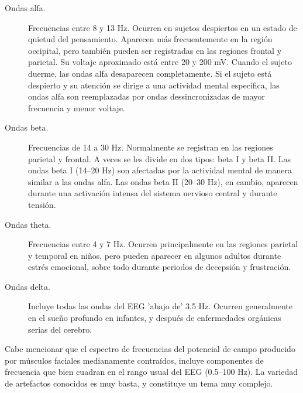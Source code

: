 \documentclass[12pt,a4paper]{mitthesis}
\begin{document}
\begin{description}
\item[Ondas alfa.] Frecuencias entre 8 y 13 Hz. Ocurren en sujetos despiertos en un estado de 
quietud del pensamiento. Aparecen m\'as frecuentemente en la regi\'on occipital, pero tambi\'en 
pueden ser registradas en las regiones frontal y parietal. Su voltaje aproximado est\'a entre 20 y 
200 mV. Cuando el sujeto duerme, las ondas alfa desaparecen completamente. Si el sujeto est\'a
despierto y su atenci\'on se dirige a una actividad mental espec\'ifica, las ondas alfa
son reemplazadas por ondas dessincronizadas de mayor frecuencia y menor voltaje.

\item[Ondas beta.] Frecuencias de 14 a 30 Hz. Normalmente se registran en las regiones parietal y 
frontal. A veces se les divide en dos tipos: beta I y beta II. Las ondas beta I (14--20 Hz)
son afectadas por la actividad mental de manera similar a las ondas alfa.
Las ondas beta II (20--30 Hz), en cambio, aparecen durante una activaci\'on intensa del sistema 
nervioso central y durante tensi\'on.

\item[Ondas theta.] Frecuencias entre 4 y 7 Hz. Ocurren principalmente en las regiones parietal y 
temporal en ni\~nos, pero pueden aparecer en algunos adultos durante estr\'es emocional, sobre 
todo durante periodos de decepsi\'on y frustraci\'on.

\item[Ondas delta.] Incluye todas las ondas del EEG 'abajo de' 3.5 Hz. Ocurren generalmente en el 
sue\~no profundo en infantes, y despu\'es de enfermedades org\'anicas serias del cerebro.
\end{description}


Cabe mencionar que el espectro de frecuencias del potencial de campo producido por m\'usculos 
faciales medianamente contra\'idos, incluye componentes de frecuencia que bien cuadran en el rango 
usual del EEG (0.5--100 Hz).
La variedad de artefactos conocidos es muy basta, y constituye un tema muy complejo.
\end{document}
